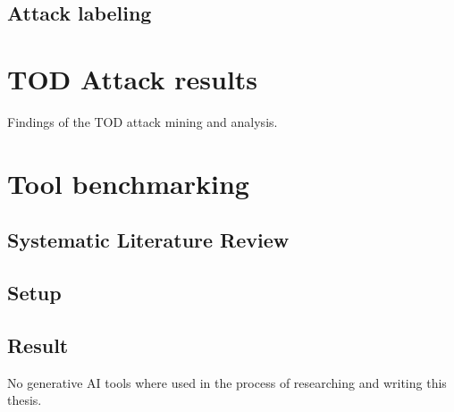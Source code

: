 \documentclass[draft,final]{vutinfth} %
\begin{document}
\section{Attack labeling}

\chapter{TOD Attack results}

Findings of the TOD attack mining and analysis.

\chapter{Tool benchmarking}

\section{Systematic Literature Review}

\section{Setup}

\section{Result}




\backmatter

\begin{aitools}
    No generative AI tools where used in the process of researching and writing this thesis.
\end{aitools}

\listoffigures %

\cleardoublepage %
\listoftables %

\listofalgorithms
{}

\printindex

\printglossaries



\end{document}
